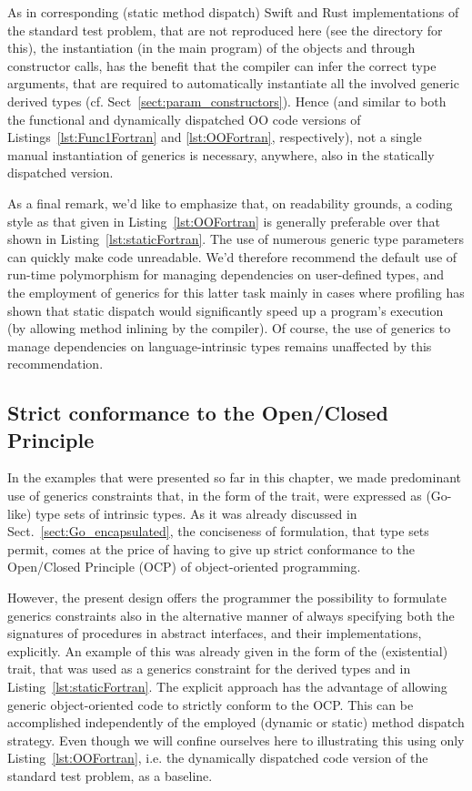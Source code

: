\documentclass[11pt,oneside]{report}
\newcommand{\code}[1]{{\selectfont\ttfamily{#1}}}
\begin{document}
As in corresponding (static method dispatch) Swift and Rust
implementations of the standard test problem, that are not reproduced
here (see the \code{Code} directory for this), the
instantiation (in the main program) of the objects \code{other} and
\code{drv} through constructor calls, has the benefit that the
compiler can infer the correct type arguments, that are required to
automatically instantiate all the involved generic derived types
(cf. Sect~\ref{sect:param_constructors}). Hence (and similar to both
the functional and dynamically dispatched OO code versions of
Listings~\ref{lst:Func1Fortran} and \ref{lst:OOFortran},
respectively), not a single manual instantiation of generics is
necessary, anywhere, also in the statically dispatched version.

As a final remark, we'd like to emphasize that, on readability
grounds, a coding style as that given in Listing~\ref{lst:OOFortran}
is generally preferable over that shown in
Listing~\ref{lst:staticFortran}. The use of numerous generic type
parameters can quickly make code unreadable. We'd therefore recommend
the default use of run-time polymorphism for managing dependencies on
user-defined types, and the employment of generics for this latter
task mainly in cases where profiling has shown that static dispatch
would significantly speed up a program's execution (by allowing method
inlining by the compiler). Of course, the use of generics to manage
dependencies on language-intrinsic types remains unaffected by this
recommendation.


\subsection{Strict conformance to the Open/Closed Principle}
\label{sect:ocp_conformance}

In the examples that were presented so far in this chapter, we made
predominant use of generics constraints that, in the form of the
\code{INumeric} trait, were expressed as (Go-like) type sets of
intrinsic types. As it was already discussed in
Sect.~\ref{sect:Go_encapsulated}, the conciseness of formulation, that
type sets permit, comes at the price of having to give up strict
conformance to the Open/Closed Principle (OCP) of object-oriented
programming.

However, the present design offers the programmer the possibility to
formulate generics constraints also in the alternative manner of
always specifying both the signatures of procedures in abstract
interfaces, and their implementations, explicitly. An example of this
was already given in the form of the (existential) \code{ISum} trait,
that was used as a generics constraint for the derived types
\code{PairwiseSum} and \code{Averager} in
Listing~\ref{lst:staticFortran}. The explicit approach has the
advantage of allowing generic object-oriented code to strictly conform
to the OCP.  This can be accomplished independently of the employed
(dynamic or static) method dispatch strategy. Even though we will
confine ourselves here to illustrating this using only
Listing~\ref{lst:OOFortran}, i.e. the dynamically dispatched code
version of the standard test problem, as a baseline.
\end{document}
